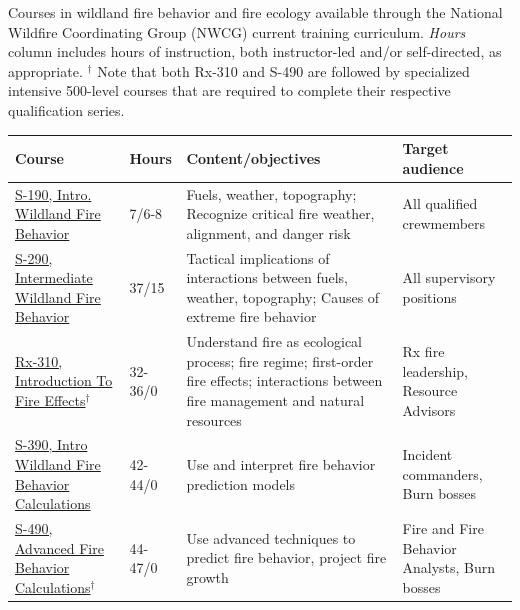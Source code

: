 \documentclass[fire,article,submit,moreauthors,pdftex]{Definitions/mdpi}
\begin{document}


\appendixstart
\appendix

\begin{specialtable}[H] 
\caption{Courses in wildland fire behavior and fire ecology available through the National Wildfire Coordinating Group (NWCG) current training curriculum.
\emph{Hours} column includes hours of instruction, both instructor-led and/or self-directed, as appropriate. 
$^\dagger$ Note that both Rx-310 and S-490 are followed by specialized intensive 500-level courses that are required to complete their respective qualification series.}
\label{tab:training}
\begin{tabular}{p{3cm}p{1.25cm}p{4.25cm}p{3cm}}
\toprule
\textbf{Course} & \textbf{Hours} & \textbf{Content/objectives} & \textbf{Target audience} \\ \midrule

\href{https://www.nwcg.gov/publications/training-courses/s-190}{S-190, Intro. Wildland Fire Behavior} & 7/6-8 & Fuels, weather, topography; Recognize critical fire weather, alignment, and danger risk & All qualified crewmembers \\
\href{https://www.nwcg.gov/publications/training-courses/s-290}{S-290, Intermediate Wildland Fire Behavior} & 37/15 & Tactical implications of interactions between fuels, weather, topography; Causes of extreme fire behavior & All supervisory positions \\
\href{https://www.nwcg.gov/publications/training-courses/rx-310}{Rx-310, Introduction To Fire Effects}$^\dagger$ & 32-36/0 & Understand fire as ecological process; fire regime; first-order fire effects; interactions between fire management and natural resources & Rx fire leadership, Resource Advisors \\
\href{https://www.nwcg.gov/publications/training-courses/s-390}{S-390, Intro Wildland Fire Behavior Calculations} & 42-44/0 & Use and interpret fire behavior prediction models & Incident commanders, Burn bosses \\
\href{https://www.nwcg.gov/publications/training-courses/s-490}{S-490, Advanced Fire Behavior Calculations}$^\dagger$ & 44-47/0 & Use advanced techniques to predict fire behavior, project fire growth & Fire and Fire Behavior Analysts, Burn bosses \\
\bottomrule
\end{tabular}
\end{specialtable}
\end{document}
